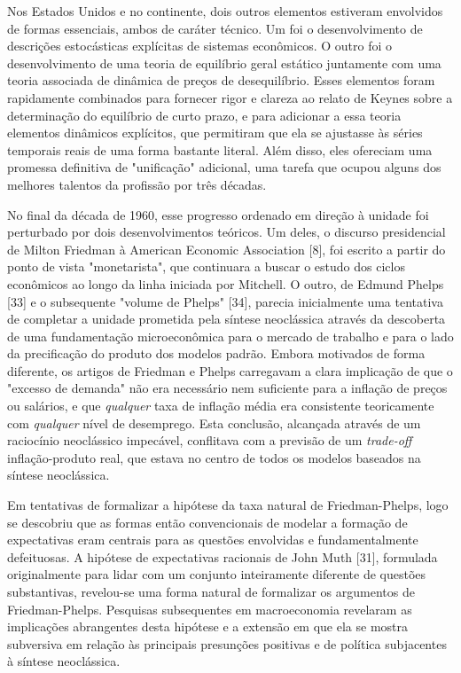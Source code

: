 \documentclass[12pt]{article}
\begin{document}
Nos Estados Unidos e no continente, dois outros elementos estiveram envolvidos de formas essenciais, ambos de caráter técnico. Um foi o desenvolvimento de descrições estocásticas explícitas de sistemas econômicos. O outro foi o desenvolvimento de uma teoria de equilíbrio geral estático juntamente com uma teoria associada de dinâmica de preços de desequilíbrio. Esses elementos foram rapidamente combinados para fornecer rigor e clareza ao relato de Keynes sobre a determinação do equilíbrio de curto prazo, e para adicionar a essa teoria elementos dinâmicos explícitos, que permitiram que ela se ajustasse às séries temporais reais de uma forma bastante literal. Além disso, eles ofereciam uma promessa definitiva de "unificação" adicional, uma tarefa que ocupou alguns dos melhores talentos da profissão por três décadas.

No final da década de 1960, esse progresso ordenado em direção à unidade foi perturbado por dois desenvolvimentos teóricos. Um deles, o discurso presidencial de Milton Friedman à American Economic Association [8], foi escrito a partir do ponto de vista "monetarista", que continuara a buscar o estudo dos ciclos econômicos ao longo da linha iniciada por Mitchell. O outro, de Edmund Phelps [33] e o subsequente "volume de Phelps" [34], parecia inicialmente uma tentativa de completar a unidade prometida pela síntese neoclássica através da descoberta de uma fundamentação microeconômica para o mercado de trabalho e para o lado da precificação do produto dos modelos padrão. Embora motivados de forma diferente, os artigos de Friedman e Phelps carregavam a clara implicação de que o "excesso de demanda" não era necessário nem suficiente para a inflação de preços ou salários, e que \textit{qualquer} taxa de inflação média era consistente teoricamente com \textit{qualquer} nível de desemprego. Esta conclusão, alcançada através de um raciocínio neoclássico impecável, conflitava com a previsão de um \textit{trade-off} inflação-produto real, que estava no centro de todos os modelos baseados na síntese neoclássica.

Em tentativas de formalizar a hipótese da taxa natural de Friedman-Phelps, logo se descobriu que as formas então convencionais de modelar a formação de expectativas eram centrais para as questões envolvidas e fundamentalmente defeituosas. A hipótese de expectativas racionais de John Muth [31], formulada originalmente para lidar com um conjunto inteiramente diferente de questões substantivas, revelou-se uma forma natural de formalizar os argumentos de Friedman-Phelps. Pesquisas subsequentes em macroeconomia revelaram as implicações abrangentes desta hipótese e a extensão em que ela se mostra subversiva em relação às principais presunções positivas e de política subjacentes à síntese neoclássica.
\end{document}
